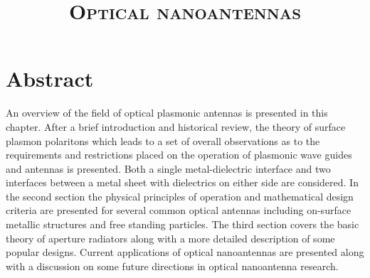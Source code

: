 \documentclass[11pt]{article}
\begin{document}
\title{\textsc{Optical nanoantennas}}

\maketitle

\section{Abstract}
%
An overview of the field of optical plasmonic antennas is presented in this chapter. After a brief introduction and historical review, the theory of surface plasmon polaritons which leads to a set of overall observations as to the requirements and restrictions placed on the operation of plasmonic wave guides and antennas is presented. Both a single metal-dielectric interface and two interfaces between a metal sheet with dielectrics on either side are considered. In the second section the physical principles of operation and mathematical design criteria are presented for several common optical antennas including on-surface metallic structures and free standing particles. The third section covers the basic theory of aperture radiators along with a more detailed description of some popular designs. Current applications of optical nanoantennas are presented along with a discussion on some future directions in optical nanoantenna research.
%
\end{document}
